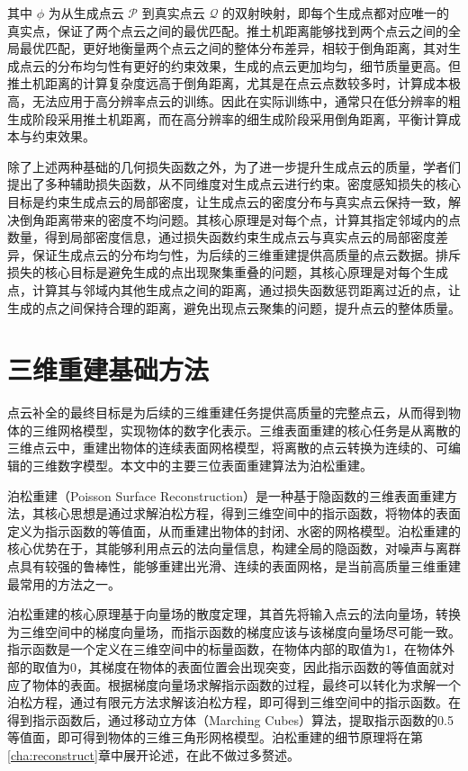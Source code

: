 其中 $\phi$ 为从生成点云 $\mathcal{P}$ 到真实点云 $\mathcal{Q}$ 的双射映射，即每个生成点都对应唯一的真实点，保证了两个点云之间的最优匹配。推土机距离能够找到两个点云之间的全局最优匹配，更好地衡量两个点云之间的整体分布差异，相较于倒角距离，其对生成点云的分布均匀性有更好的约束效果，生成的点云更加均匀，细节质量更高。但推土机距离的计算复杂度远高于倒角距离，尤其是在点云点数较多时，计算成本极高，无法应用于高分辨率点云的训练。因此在实际训练中，通常只在低分辨率的粗生成阶段采用推土机距离，而在高分辨率的细生成阶段采用倒角距离，平衡计算成本与约束效果。

除了上述两种基础的几何损失函数之外，为了进一步提升生成点云的质量，学者们提出了多种辅助损失函数，从不同维度对生成点云进行约束。密度感知损失的核心目标是约束生成点云的局部密度，让生成点云的密度分布与真实点云保持一致，解决倒角距离带来的密度不均问题。其核心原理是对每个点，计算其指定邻域内的点数量，得到局部密度信息，通过损失函数约束生成点云与真实点云的局部密度差异，保证生成点云的分布均匀性，为后续的三维重建提供高质量的点云数据。排斥损失的核心目标是避免生成的点出现聚集重叠的问题，其核心原理是对每个生成点，计算其与邻域内其他生成点之间的距离，通过损失函数惩罚距离过近的点，让生成的点之间保持合理的距离，避免出现点云聚集的问题，提升点云的整体质量。

\section{三维重建基础方法}
点云补全的最终目标是为后续的三维重建任务提供高质量的完整点云，从而得到物体的三维网格模型，实现物体的数字化表示。三维表面重建的核心任务是从离散的三维点云中，重建出物体的连续表面网格模型，将离散的点云转换为连续的、可编辑的三维数字模型。本文中的主要三位表面重建算法为泊松重建。%

泊松重建（Poisson Surface Reconstruction）是一种基于隐函数的三维表面重建方法，其核心思想是通过求解泊松方程，得到三维空间中的指示函数，将物体的表面定义为指示函数的等值面，从而重建出物体的封闭、水密的网格模型。泊松重建的核心优势在于，其能够利用点云的法向量信息，构建全局的隐函数，对噪声与离群点具有较强的鲁棒性，能够重建出光滑、连续的表面网格，是当前高质量三维重建最常用的方法之一。

泊松重建的核心原理基于向量场的散度定理，其首先将输入点云的法向量场，转换为三维空间中的梯度向量场，而指示函数的梯度应该与该梯度向量场尽可能一致。指示函数是一个定义在三维空间中的标量函数，在物体内部的取值为1，在物体外部的取值为0，其梯度在物体的表面位置会出现突变，因此指示函数的等值面就对应了物体的表面。根据梯度向量场求解指示函数的过程，最终可以转化为求解一个泊松方程，通过有限元方法求解该泊松方程，即可得到三维空间中的指示函数。在得到指示函数后，通过移动立方体（Marching Cubes）算法，提取指示函数的0.5等值面，即可得到物体的三维三角形网格模型。泊松重建的细节原理将在第\ref{cha:reconstruct}章中展开论述，在此不做过多赘述。

